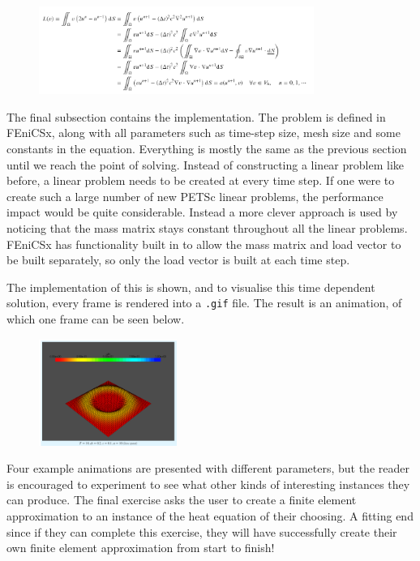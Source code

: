 \begin{figure}[h]
\centering
\includegraphics[width=0.8\textwidth, frame]{./images/notebook3/6}
\end{figure}

The final subsection contains the implementation. The problem is defined in FEniCSx, along with all parameters such as time-step size, mesh size and some constants in the equation. Everything is mostly the same as the previous section until we reach the point of solving. Instead of constructing a linear problem like before, a linear problem needs to be created at every time step. If one were to create such a large number of new PETSc linear problems, the performance impact would be quite considerable. Instead a more clever approach is used by noticing that the mass matrix stays constant throughout all the linear problems. FEniCSx has functionality built in to allow the mass matrix and load vector to be built separately, so only the load vector is built at each time step.

The implementation of this is shown, and to visualise this time dependent solution, every frame is rendered into a \texttt{.gif} file. The result is an animation, of which one frame can be seen below.

\begin{figure}[h]
\centering
\includegraphics[width=0.4\textwidth, frame]{./images/notebook3/7}
\end{figure}

Four example animations are presented with different parameters, but the reader is encouraged to experiment to see what other kinds of interesting instances they can produce. The final exercise asks the user to create a finite element approximation to an instance of the heat equation of their choosing. A fitting end since if they can complete this exercise, they will have successfully create their own finite element approximation from start to finish!
